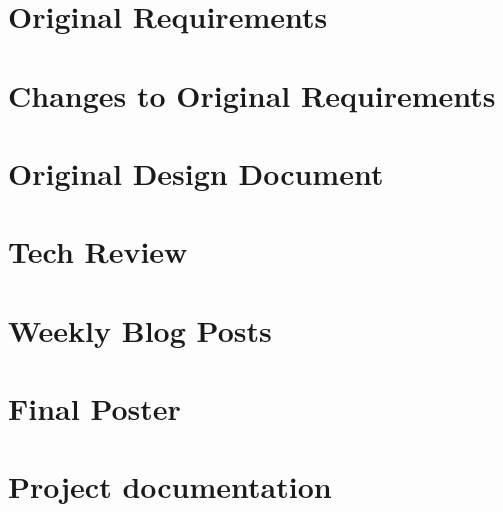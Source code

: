 \documentclass[10pt,draftclsnofoot,onecolumn]{IEEEtran}
\begin{document}
\section{Original Requirements} %

\section{Changes to Original Requirements} %

\section{Original Design Document} %

\section{Tech Review} %

\section{Weekly Blog Posts} %

\section{Final Poster} %

\section{Project documentation} %
\end{document}
